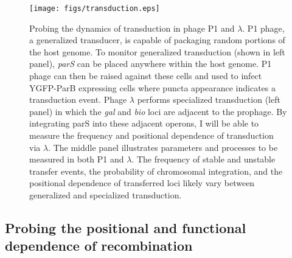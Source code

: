 \begin{figure}
	\centerline{\texttt{[image: figs/transduction.eps]}}
	\caption{Probing the dynamics of transduction in phage P1 and $\lambda$. P1
	phage, a generalized transducer, is capable of packaging random portions
	of the host genome. To monitor generalized transduction (shown in left
	panel), \textit{parS} can be placed anywhere within the host genome. P1 phage
	can then be raised against these cells and used to infect YGFP-ParB
	expressing cells where puncta appearance indicates a transduction event.  Phage $\lambda$
	performs specialized transduction (left panel) in which the \textit{gal}
	and \textit{bio} loci are adjacent to the prophage. By integrating parS
	into these adjacent operons, I will be able to measure the frequency and
	positional dependence of transduction via $\lambda$.  The middle panel
	illustrates parameters and processes to be measured in both P1 and
	$\lambda$. The frequency of stable and unstable transfer events, the
	probability of chromosomal integration, and the positional dependence of
	transferred loci likely vary between generalized and specialized transduction.}
	\label{fig:transduction_exp}
\end{figure}


\subsection*{Probing the positional and functional dependence of recombination}

